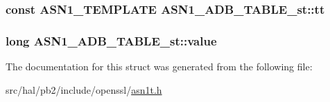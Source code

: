 \subsubsection[{\texorpdfstring{tt}{tt}}]{\setlength{\rightskip}{0pt plus 5cm}const {\bf A\+S\+N1\+\_\+\+T\+E\+M\+P\+L\+A\+TE} A\+S\+N1\+\_\+\+A\+D\+B\+\_\+\+T\+A\+B\+L\+E\+\_\+st\+::tt}\hypertarget{struct_a_s_n1___a_d_b___t_a_b_l_e__st_ae2a3f9d776e8c11c09d8b9879c63fac2}{}\label{struct_a_s_n1___a_d_b___t_a_b_l_e__st_ae2a3f9d776e8c11c09d8b9879c63fac2}
\subsubsection[{\texorpdfstring{value}{value}}]{\setlength{\rightskip}{0pt plus 5cm}long A\+S\+N1\+\_\+\+A\+D\+B\+\_\+\+T\+A\+B\+L\+E\+\_\+st\+::value}\hypertarget{struct_a_s_n1___a_d_b___t_a_b_l_e__st_a629d5818b02f9fb52b74bad469e1e5b0}{}\label{struct_a_s_n1___a_d_b___t_a_b_l_e__st_a629d5818b02f9fb52b74bad469e1e5b0}


The documentation for this struct was generated from the following file\+:\begin{DoxyCompactItemize}
\item 
src/hal/pb2/include/openssl/\hyperlink{asn1t_8h}{asn1t.\+h}\end{DoxyCompactItemize}
